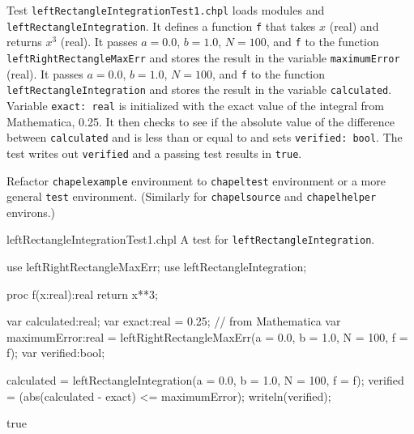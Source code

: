   \begin{enumspec}
  \item{}
    Test \lstinline{leftRectangleIntegrationTest1.chpl} loads modules
     and
    \lstinline[breaklines=true]{leftRectangleIntegration}.
    It defines a function \lstinline{f} that takes $x$ (real) and returns $x^3$ (real).
    It passes $a=0.0$, $b=1.0$, $N=100$, and \lstinline{f} to the function
    \lstinline{leftRightRectangleMaxErr} and stores the result in the variable
    \lstinline{maximumError} (real).
    It passes $a=0.0$, $b=1.0$, $N=100$, and \lstinline{f} to the function
    \lstinline{leftRectangleIntegration} and stores the result in the variable
    \lstinline{calculated}.
    Variable \lstinline{exact: real} is initialized with the exact value of the integral from
    Mathematica, 0.25.
    It then checks to see if the absolute value of the difference between \lstinline{calculated} 
    and  is less than or equal to  and sets 
    \lstinline{verified: bool}. The test writes out \lstinline{verified} and a passing
    test results in \lstinline{true}.
  \end{enumspec}

  \begin{TODO}
    Refactor \lstinline{chapelexample} environment to \lstinline{chapeltest} environment or
    a more general \lstinline{test} environment. (Similarly for \lstinline{chapelsource} and
    \lstinline{chapelhelper} environs.)
  \end{TODO}

  \begin{chapelexample}{leftRectangleIntegrationTest1.chpl}
    A test for \lstinline{leftRectangleIntegration}.
    \begin{chapelpre}
    \end{chapelpre}
    \begin{chapel}
      use leftRightRectangleMaxErr;
      use leftRectangleIntegration;

      proc f(x:real):real {
        return x**3;
      } 

      var calculated:real;
      var exact:real = 0.25;  // from Mathematica
      var maximumError:real = leftRightRectangleMaxErr(a = 0.0, b = 1.0, N = 100, f = f);
      var verified:bool;

      calculated = leftRectangleIntegration(a = 0.0, b = 1.0, N = 100, f = f);
      verified = (abs(calculated - exact) <= maximumError);
      writeln(verified);
    \end{chapel}
    \begin{chapelpost}
    \end{chapelpost}
    \begin{chapeloutput}
true
    \end{chapeloutput}
  \end{chapelexample}

